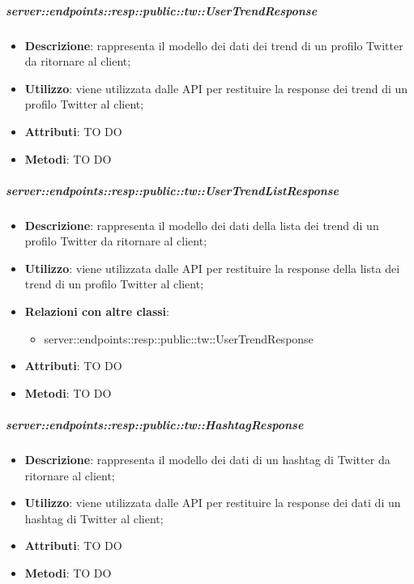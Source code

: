     \subparagraph{server::endpoints::resp::public::tw::UserTrendResponse} %
    \label{subp:bdsm_app_server_endpoints_resp_public_tw_usertrendresponse}
    \begin{itemize}
      \item \textbf{Descrizione}: rappresenta il modello dei dati dei trend di un profilo Twitter da ritornare al client;
      \item \textbf{Utilizzo}: viene utilizzata dalle API per restituire la response dei trend di un profilo Twitter al client;
      
	  \item \textbf{Attributi}: TO DO
	  \item \textbf{Metodi}: TO DO
    \end{itemize}

    \subparagraph{server::endpoints::resp::public::tw::UserTrendListResponse} %
    \label{subp:bdsm_app_server_endpoints_resp_public_tw_usertrendlistresponse}
    \begin{itemize}
      \item \textbf{Descrizione}: rappresenta il modello dei dati della lista dei trend di un profilo Twitter da ritornare al client;
      \item \textbf{Utilizzo}: viene utilizzata dalle API per restituire la response della lista dei trend di un profilo Twitter al client;
      \item \textbf{Relazioni con altre classi}:
        \begin{itemize}
          \item server::endpoints::resp::public::tw::UserTrendResponse
        \end{itemize}
	  \item \textbf{Attributi}: TO DO
	  \item \textbf{Metodi}: TO DO
    \end{itemize}

    \subparagraph{server::endpoints::resp::public::tw::HashtagResponse} %
    \label{subp:bdsm_app_server_endpoints_resp_public_tw_hashtagresponse}
    \begin{itemize}
      \item \textbf{Descrizione}: rappresenta il modello dei dati di un hashtag di Twitter da ritornare al client;
      \item \textbf{Utilizzo}: viene utilizzata dalle API per restituire la response dei dati di un hashtag di Twitter al client;
      
	  \item \textbf{Attributi}: TO DO
	  \item \textbf{Metodi}: TO DO
    \end{itemize}

